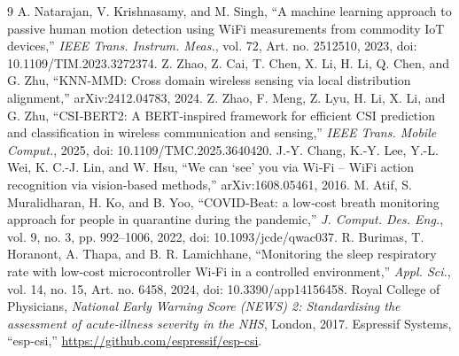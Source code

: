 \documentclass[conference]{IEEEtran}
\begin{document}
\begin{thebibliography}{9}
 A. Natarajan, V. Krishnasamy, and M. Singh, ``A machine learning approach to passive human
  motion detection using WiFi measurements from commodity IoT devices,'' \emph{IEEE Trans. Instrum. Meas.}, vol. 72,
  Art. no. 2512510, 2023, doi: 10.1109/TIM.2023.3272374.
 Z. Zhao, Z. Cai, T. Chen, X. Li, H. Li, Q. Chen, and G. Zhu, ``KNN‑MMD: Cross domain wireless sensing
  via local distribution alignment,'' arXiv:2412.04783, 2024.
 Z. Zhao, F. Meng, Z. Lyu, H. Li, X. Li, and G. Zhu, ``CSI‑BERT2: A BERT‑inspired framework for
  efficient CSI prediction and classification in wireless communication and sensing,'' \emph{IEEE Trans. Mobile
  Comput.}, 2025, doi: 10.1109/TMC.2025.3640420.
 J.-Y. Chang, K.-Y. Lee, Y.-L. Wei, K. C.-J. Lin, and W. Hsu, ``We can `see' you via Wi‑Fi – WiFi
  action recognition via vision‑based methods,'' arXiv:1608.05461, 2016.
 M. Atif, S. Muralidharan, H. Ko, and B. Yoo, ``COVID‑Beat: a low‑cost breath monitoring approach
  for people in quarantine during the pandemic,'' \emph{J. Comput. Des. Eng.}, vol. 9, no. 3, pp. 992–1006, 2022,
  doi: 10.1093/jcde/qwac037.
 R. Burimas, T. Horanont, A. Thapa, and B. R. Lamichhane, ``Monitoring the sleep respiratory rate
  with low‑cost microcontroller Wi‑Fi in a controlled environment,'' \emph{Appl. Sci.}, vol. 14, no. 15, Art. no. 6458,
  2024, doi: 10.3390/app14156458.
 Royal College of Physicians, \emph{National Early Warning Score (NEWS) 2: Standardising the assessment
  of acute‑illness severity in the NHS}, London, 2017.
 Espressif Systems, ``esp‑csi,'' \url{https://github.com/espressif/esp-csi}.
\end{thebibliography}
\end{document}
